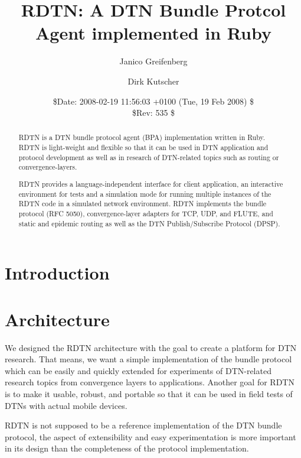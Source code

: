 \documentclass{article}
\begin{document}
\title{RDTN: A DTN Bundle Protcol Agent implemented in Ruby}

\author{Janico Greifenberg \and Dirk Kutscher}
\date{\$Date: 2008-02-19 11:56:03 +0100 (Tue, 19 Feb 2008) \$\\
\$Rev: 535 \$}

\maketitle

\begin{abstract}

RDTN is a DTN bundle protocol agent (BPA) implementation written in Ruby. RDTN
is light-weight and flexible so that it can be used in DTN application and
protocol development as well as in research of DTN-related topics such as
routing or convergence-layers. 

RDTN provides a language-independent interface for client application, an
interactive environment for tests and a simulation mode for running multiple
instances of the RDTN code in a simulated network environment. RDTN implements
the bundle protocol (RFC 5050), convergence-layer adapters for TCP, UDP, and
FLUTE, and static and epidemic routing as well as the DTN Publish/Subscribe
Protocol (DPSP).

\end{abstract}

\section{Introduction}\label{sec.intro}

\section{Architecture}\label{sec.arch}

We designed the RDTN architecture with the goal to create a platform for DTN
research. That means, we want a simple implementation of the bundle protocol
which can be easily and quickly extended for experiments of DTN-related research
topics from convergence layers to applications. Another goal for RDTN is to make
it usable, robust, and portable so that it can be used in field tests of DTNs
with actual mobile devices.

RDTN is not supposed to be a reference implementation of the DTN bundle
protocol, the aspect of extensibility and easy experimentation is more important
in its design than the completeness of the protocol implementation.
\end{document}
